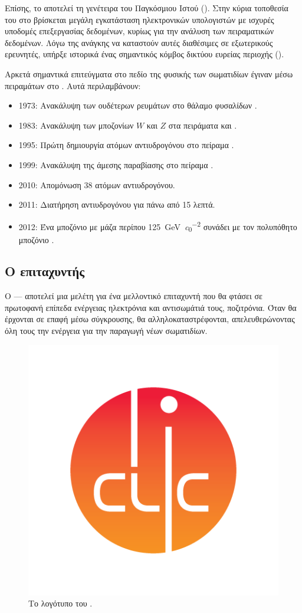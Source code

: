 Επίσης, το  αποτελεί τη γενέτειρα του Παγκόσμιου Ιστού ().
Στην κύρια τοποθεσία του στο  βρίσκεται μεγάλη εγκατάσταση ηλεκτρονικών υπολογιστών με ισχυρές υποδομές επεξεργασίας δεδομένων, κυρίως για την ανάλυση των πειραματικών δεδομένων. 
Λόγω της ανάγκης να καταστούν αυτές διαθέσιμες σε εξωτερικούς ερευνητές, υπήρξε ιστορικά ένας σημαντικός κόμβος δικτύου ευρείας περιοχής ().

Αρκετά σημαντικά επιτεύγματα στο πεδίο της φυσικής των σωματιδίων έγιναν μέσω πειραμάτων στο . Αυτά περιλαμβάνουν:
\begin{itemize}
\item 1973: Ανακάλυψη των ουδέτερων ρευμάτων στο θάλαμο φυσαλίδων .
\item 1983: Ανακάλυψη των μποζονίων $W$ και $Z$ στα πειράματα  και .
\item 1995: Πρώτη δημιουργία ατόμων αντιυδρογόνου στο πείραμα .
\item 1999: Ανακάλυψη της άμεσης παραβίασης  στο πείραμα .
\item 2010: Απομόνωση 38 ατόμων αντιυδρογόνου.
\item 2011: Διατήρηση αντιυδρογόνου για πάνω από 15 λεπτά.
\item 2012: Ένα μποζόνιο με μάζα περίπου \SI[per-mode = symbol]{125}{\giga \electronvolt \per  \clight \squared} συνάδει με τον πολυπόθητο μποζόνιο .
\end{itemize}


\subsection{Ο επιταχυντής }


Ο  --- αποτελεί μια μελέτη για ένα μελλοντικό επιταχυντή που θα φτάσει σε πρωτοφανή επίπεδα ενέργειας ηλεκτρόνια και αντισωμάτιά τους, ποζιτρόνια. 
Όταν θα έρχονται σε επαφή μέσω σύγκρουσης, θα αλληλοκαταστρέφονται, απελευθερώνοντας όλη τους την ενέργεια για την παραγωγή νέων σωματιδίων.

\begin{figure}[b]
\includegraphics[trim={12mm 12mm 12mm 12mm},clip=true,width=0.25\linewidth]{images/CLIClogo}
\centering
\caption{Το λογότυπο του .}
\label{img:CLIClogo}
\end{figure}

